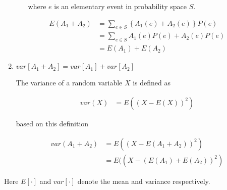 \begin{enumerate}
\begin{enumerate}
where $e$ is an elementary event in probability space $S$.
\end{enumerate}


\begin{equation*}
\begin{aligned}
E(A_1 + A_2) &= \sum_{e \in S} \left \{A_1(e) + A_2(e) \right \} P(e)\\
&= \sum_{e \in S} A_1(e) P(e)+ A_2(e) P(e)\\
&= E(A_1)  + E(A_2) 
\end{aligned}
\end{equation*}

  \item $var[A_1 + A_2] = var[A_1] + var[A_2]$
  
The variance of a random variable $X$ is defined as 

\begin{equation*}
\begin{aligned}
var(X) &= E((X-E(X))^2)
\end{aligned}
\end{equation*} 

based on this definition

\begin{equation*}
\begin{aligned}
var(A_1 + A_2) &= E((X-E(A_1 + A_2))^2)\\
&= E((X-(E(A_1) +E( A_2))^2)
\end{aligned}
\end{equation*} 

  \end{enumerate}

  Here $E[\cdot]$ and $var[\cdot]$ denote the mean and variance
  respectively.
